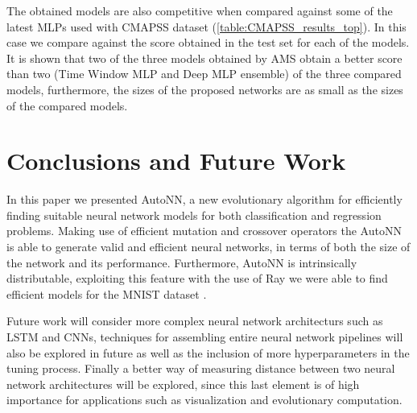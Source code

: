 \documentclass[journal]{IEEEtran}
\begin{document}
The obtained models are also competitive when compared against some of the latest MLPs used with CMAPSS dataset (\ref{table:CMAPSS_results_top}). In this case we compare against the score obtained in the test set for each of the models. It is shown that two of the three models obtained by AMS obtain a better score than two (Time Window MLP and Deep MLP ensemble) of the three compared models, furthermore, the sizes of the proposed networks are as small as the sizes of the compared models. 



\section{Conclusions and Future Work}
\label{sec:conclusions}

In this paper we presented AutoNN, a new evolutionary algorithm for efficiently finding suitable neural network models for both classification and regression problems. Making use of efficient mutation and crossover operators the AutoNN is able to generate valid and efficient neural networks, in terms of both the size of the network and its performance. Furthermore, AutoNN is intrinsically distributable, exploiting this feature with the use of Ray \cite{Moritz2017} we were able to find efficient models for the MNIST dataset \cite{Lecun2010}.

Future work will consider more complex neural network architecturs such as LSTM and CNNs, techniques for assembling entire neural network pipelines will also be explored in future as well as the inclusion of more hyperparameters in the tuning process. Finally a better way of measuring distance between two neural network architectures will be explored, since this last element is of high importance for applications such as visualization and evolutionary computation.

\end{document}

